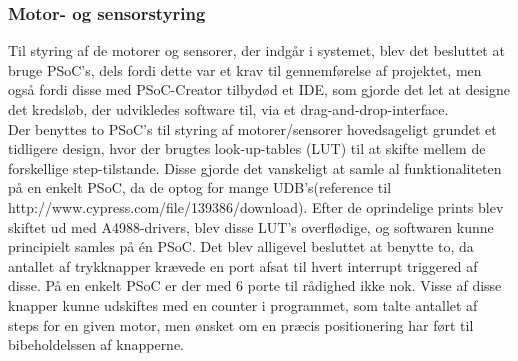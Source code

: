 \subsubsection{Motor- og sensorstyring}
Til styring af de motorer og sensorer, der indgår i systemet, blev det besluttet at bruge PSoC's, dels fordi dette var et krav til gennemførelse af projektet, men også fordi disse med PSoC-Creator tilbydød et IDE, som gjorde det let at designe det kredsløb, der udvikledes software til, via et drag-and-drop-interface. \\

Der benyttes to PSoC's til styring af motorer/sensorer hovedsageligt grundet et tidligere design, hvor der brugtes look-up-tables (LUT) til at skifte mellem de forskellige step-tilstande. Disse gjorde det vanskeligt at samle al funktionaliteten på en enkelt PSoC, da de optog for mange UDB's(reference til http://www.cypress.com/file/139386/download). Efter de oprindelige prints blev skiftet ud med A4988-drivers, blev disse LUT's overflødige, og softwaren kunne principielt samles på én PSoC. Det blev alligevel besluttet at benytte to, da antallet af trykknapper krævede en port afsat til hvert interrupt triggered af disse. På en enkelt PSoC er der med 6 porte til rådighed ikke nok. Visse af disse knapper kunne udskiftes med en counter i programmet, som talte antallet af steps for en given motor, men ønsket om en præcis positionering har ført til bibeholdelssen af knapperne.